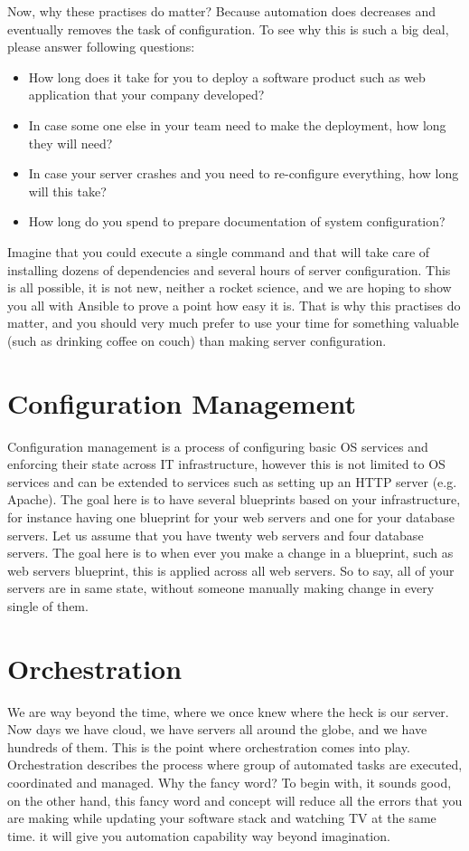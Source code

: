 \documentclass[10pt]{book}
\begin{document}
Now, why these practises do matter? Because automation does decreases and
eventually removes the task of configuration. To see why this is such a big deal, please answer following questions:
\begin{itemize}
\item How long does it take for you to deploy a software product such as web application that your company developed?
\item In case some one else in your team need to make the deployment, how long they 
will need?
\item In case your server crashes and you need to re-configure everything, how long will this take?
\item How long do you spend to prepare documentation of system configuration?
\end{itemize}

Imagine that you could execute a single command and that will take care of installing dozens of 
dependencies and several hours of server configuration. This is all possible, it 
is not new, neither a rocket science, and we are hoping to show you all with Ansible to prove a point
how easy it is. That is why this practises do matter,
and you should very much prefer to use your time for something valuable 
(such as drinking coffee on couch) than making server configuration.


\section{Configuration Management}
Configuration management is a process of configuring basic OS 
services and enforcing their state across IT infrastructure, however this is not 
limited to OS services and can be extended to services such as setting up an HTTP server (e.g. 
Apache). The goal here is to have several blueprints based on your infrastructure, 
for instance having one blueprint for your web servers and one for your database servers. Let us assume that
you have twenty web servers and four database servers. The goal here is to when 
ever you make a change in a blueprint, such as web servers blueprint, this is applied 
across all web servers. So to say, all of your servers are in same state, 
without someone manually making change in every single of them.

 
\section{Orchestration}
We are way beyond the time, where we once knew where the heck is our server. 
Now days we have cloud, we have servers all around the globe, and we have hundreds of them. 
This is the point where orchestration comes into play. 
Orchestration describes the process where group of automated tasks are executed, 
coordinated and managed. Why the fancy word? 
To begin with, it sounds good, on the other hand, this fancy word and concept will reduce 
all the errors that you are making while updating your 
software stack and watching TV at the same time. it will give you automation 
capability way beyond imagination. 
\end{document}
